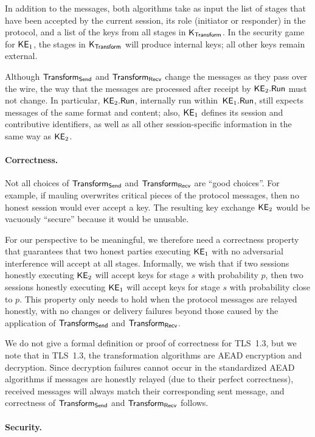 In addition to the messages, both algorithms take as input the list of stages that have been accepted by the current session, its role (initiator or responder) in the protocol, and a list of the keys from all stages in $\mathsf{K}_{\mathsf{Transform}}$. 
In the security game for $\mathsf{KE}_1$, the stages in $\mathsf{K}_{\mathsf{Transform}}$ will produce internal keys; all other keys remain external.

Although $\mathsf{Transform}_{\mathsf{Send}}$ and $\mathsf{Transform}_{\mathsf{Recv}}$ change the messages as they pass over the wire, the way that the messages are processed after receipt by $\mathsf{KE}_2.\mathsf{Run}$ must not change.
In particular, $\mathsf{KE}_2.\mathsf{Run}$, internally run within~$\mathsf{KE}_1.\mathsf{Run}$, still expects messages of the same format and content;
also, $\mathsf{KE}_1$ defines its session and contributive identifiers, as well as all other session-specific information in the same way as $\mathsf{KE}_2$.


\paragraph{Correctness.}

Not all choices of $\mathsf{Transform}_{\mathsf{Send}}$ and $\mathsf{Transform}_{\mathsf{Recv}}$ are ``good choices''. 
For example, if mauling overwrites critical pieces of the protocol messages, then no honest session would ever accept a key. 
The resulting key exchange $\mathsf{KE}_2$ would be vacuously ``secure'' because it would be unusable. 


For our perspective to be meaningful, we therefore need a correctness property that guarantees that two honest parties executing $\mathsf{KE}_1$ with no adversarial interference will accept at all stages. 
%
Informally, we wish that if two sessions honestly executing $\mathsf{KE}_2$ will accept keys for stage $s$ with probability $p$, then two sessions honestly executing $\mathsf{KE}_1$ will accept keys for stage $s$ with probability close to $p$. 
This property only needs to hold when the protocol messages are relayed honestly, with no changes or delivery failures beyond those caused by the application of $\mathsf{Transform}_{\mathsf{Send}}$ and $\mathsf{Transform}_{\mathsf{Recv}}$.

We do not give a formal definition or proof of correctness for TLS~1.3, but we note that in TLS~1.3, the transformation algorithms are AEAD encryption and decryption.
Since decryption failures cannot occur in the standardized AEAD algorithms if messages are honestly relayed (due to their perfect correctness),
received messages will always match their corresponding sent message, and correctness of $\mathsf{Transform}_{\mathsf{Send}}$ and $\mathsf{Transform}_{\mathsf{Recv}}$ follows.


\paragraph{Security.}

